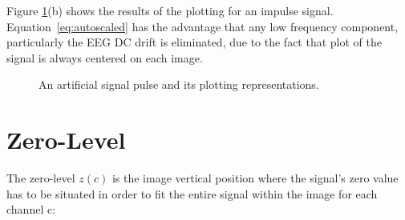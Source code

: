 Figure \ref{fig:plottingscheme}(b) shows the results of the plotting for an impulse signal.  Equation~\ref{eq:autoscaled} has the advantage that any low frequency component, particularly the EEG DC drift is eliminated, due to the fact that plot of the signal is always centered on each image.

\begin{figure}[htb]
\centering
{}
\caption[Signal plotting schemes]{An artificial signal pulse and its plotting representations.}
\label{fig:plottingscheme}
\end{figure}

\section{Zero-Level}

The zero-level $z(c)$ is the image vertical position where the signal's zero value has to be situated in order to fit the entire signal within the image for each channel c:

